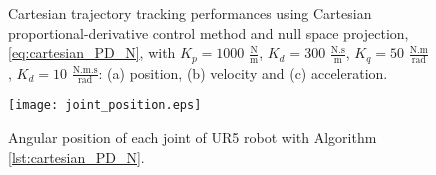 \begin{figure}%
	\centering
	\caption{Cartesian trajectory tracking performances using Cartesian proportional-derivative control method and null space projection, \eqref{eq:cartesian_PD_N}, with  ${K_{p}}=1000$ $\mathrm{\frac{N}{m}}$, $K_{d}= 300$ $\mathrm{\frac{N.s}{m}}$, ${K_{q}}=50$ $\mathrm{\frac{N.m}{rad}}$, $K_{d}= 10$ $\mathrm{\frac{N.m.s}{rad}}$: (a) position, (b) velocity and (c) acceleration.}
	\label{fig:act_1.5_ee_position}
\end{figure}

\begin{figure}
    \centering
    \texttt{[image: joint\_position.eps]}	
    \caption{Angular position of each joint of UR5 robot with Algorithm \ref{lst:cartesian_PD_N}.}
    \label{fig:act_1.5_joint_position}
\end{figure}

